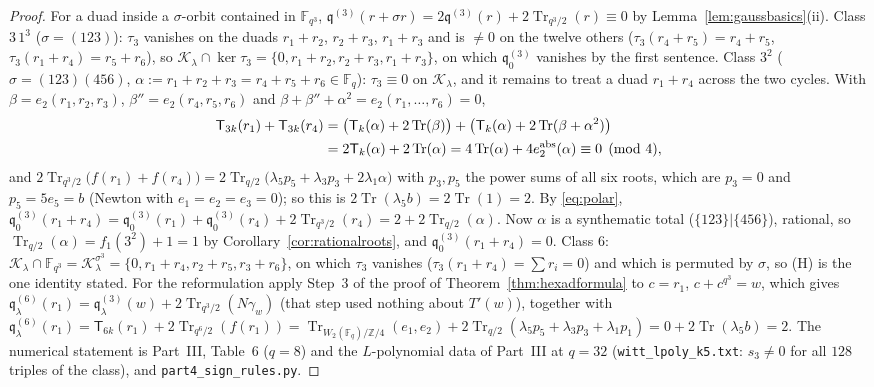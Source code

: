 \documentclass[12pt,a4paper]{amsart}
\theoremstyle{definition}
\newcommand{\F}{\mathbb{F}}
\newcommand{\Z}{\mathbb{Z}}
\newcommand{\Tr}{\operatorname{Tr}}
\newcommand{\Kk}{\mathcal{K}}
\newcommand{\qq}{\mathfrak{q}}
\newcommand{\Tw}{\mathsf{T}}
\begin{document}
\begin{proof}
For a duad inside a $\sigma$-orbit contained in $\F_{q^3}$, $\qq^{(3)}(r+\sigma r)=2\qq^{(3)}(r)+2\Tr_{q^3/2}(r)\equiv0$ by Lemma~\ref{lem:gaussbasics}(ii). Class $3\,1^3$ ($\sigma=(123)$): $\tau_3$ vanishes on the duads $r_1+r_2$, $r_2+r_3$, $r_1+r_3$ and is $\ne0$ on the twelve others ($\tau_3(r_4+r_5)=r_4+r_5$, $\tau_3(r_1+r_4)=r_5+r_6$), so $\Kk_\lambda\cap\ker\tau_3=\{0,r_1+r_2,r_2+r_3,r_1+r_3\}$, on which $\qq^{(3)}_0$ vanishes by the first sentence. Class $3^2$ ($\sigma=(123)(456)$, $\alpha:=r_1+r_2+r_3=r_4+r_5+r_6\in\F_q$): $\tau_3\equiv0$ on $\Kk_\lambda$, and it remains to treat a duad $r_1+r_4$ across the two cycles. With $\beta=e_2(r_1,r_2,r_3)$, $\beta''=e_2(r_4,r_5,r_6)$ and $\beta+\beta''+\alpha^2=e_2(r_1,\dots,r_6)=0$,
\begin{align*}
\Tw_{3k}(r_1)+\Tw_{3k}(r_4)&=\bigl(\Tw_k(\alpha)+2\Tr(\beta)\bigr)+\bigl(\Tw_k(\alpha)+2\Tr(\beta+\alpha^2)\bigr)\\
&=2\Tw_k(\alpha)+2\Tr(\alpha)=4\Tr(\alpha)+4e_2^{\rm abs}(\alpha)\equiv0\pmod 4,
\end{align*}
and $2\Tr_{q^3/2}\bigl(f(r_1)+f(r_4)\bigr)=2\Tr_{q/2}\bigl(\lambda_5p_5+\lambda_3p_3+2\lambda_1\alpha\bigr)$ with $p_3,p_5$ the power sums of all six roots, which are $p_3=0$ and $p_5=5e_5=b$ (Newton with $e_1=e_2=e_3=0$); so this is $2\Tr(\lambda_5b)=2\Tr(1)=2$. By \eqref{eq:polar}, $\qq^{(3)}_0(r_1+r_4)=\qq^{(3)}_0(r_1)+\qq^{(3)}_0(r_4)+2\Tr_{q^3/2}(r_4)=2+2\Tr_{q/2}(\alpha)$. Now $\alpha$ is a synthematic total ($\{123\}|\{456\}$), rational, so $\Tr_{q/2}(\alpha)=f_1(3^2)+1=1$ by Corollary~\ref{cor:rationalroots}, and $\qq^{(3)}_0(r_1+r_4)=0$. Class $6$: $\Kk_\lambda\cap\F_{q^3}=\Kk_\lambda^{\sigma^3}=\{0,r_1+r_4,r_2+r_5,r_3+r_6\}$, on which $\tau_3$ vanishes ($\tau_3(r_1+r_4)=\sum r_i=0$) and which is permuted by $\sigma$, so (H) is the one identity stated. For the reformulation apply Step~3 of the proof of Theorem~\ref{thm:hexadformula} to $c=r_1$, $c+c^{q^3}=w$, which gives $\qq^{(6)}_\lambda(r_1)=\qq^{(3)}_\lambda(w)+2\Tr_{q^3/2}(N\gamma_w)$ (that step used nothing about $T'(w)$), together with $\qq^{(6)}_\lambda(r_1)=\Tw_{6k}(r_1)+2\Tr_{q^6/2}(f(r_1))=\Tr_{W_2(\F_q)/\Z/4}(e_1,e_2)+2\Tr_{q/2}(\lambda_5p_5+\lambda_3p_3+\lambda_1p_1)=0+2\Tr(\lambda_5b)=2$. The numerical statement is Part~III, Table~6 ($q=8$) and the $L$-polynomial data of Part~III at $q=32$ (\texttt{witt\_lpoly\_k5.txt}: $s_3\ne0$ for all $128$ triples of the class), and \texttt{part4\_sign\_rules.py}.
\end{proof}
\end{document}
